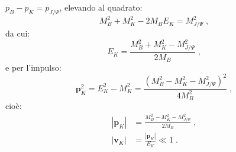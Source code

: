 \begin{enumerate}
$p_B-p_K=p_{J/\Psi}$, elevando al quadrato:
\begin{equation}
M_B^2+M_K^2-2M_BE_K=M^2_{J/\Psi}\;,
\end{equation}
da cui:
\begin{equation}
E_K=\frac{M^2_B+M_K^2-M^2_{J/\Psi}}{2M_B}\;,
\end{equation}
e per l'impulso:
\begin{equation}
\mathbf{p}_K^2=E_K^2-M_K^2=\frac{(M_B^2-M_K^2-M^2_{J/\Psi})^2}{4M_B^2}\;,
\end{equation}
cioè:
\begin{align}
|\mathbf{p}_K| &=\frac{M_B^2-M_K^2-M^2_{J/\Psi}}{2M_B}\;, \\
|\mathbf{v}_K| &=\frac{|\mathbf{p}_K|}{E_K}\ll 1\;.
\end{align}
\end{enumerate}